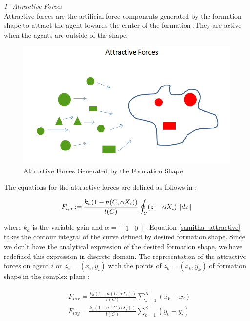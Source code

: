 \textit{			1- Attractive Forces} \\ 
Attractive forces are the artificial force components generated by the formation shape to attract the agent towards the center of the formation .They are active when the agents are outside of the shape. 

\begin{figure}[H]
\caption{Attractive Forces Generated by the Formation Shape}
\centering
\includegraphics[scale = 0.60]{attractive_forces}
\end{figure}	

The equations for the attractive forces are defined as follows in \cite{17}:			

\begin{equation} \label{samitha_attractive}
F_{i,a} := \frac{k_a (1-n(C,\alpha X_i))}{l(C)} \oint_C(z-\alpha X_i)\left\lVert dz\right\rVert
\end{equation}

where $k_a$ is the variable gain and $\alpha = \begin{bmatrix}
1 & 0
		\end{bmatrix}$. Equation \ref{samitha_attractive} takes the contour integral of the curve defined by desired formation shape. Since we don't have the analytical expression of the desired formation shape, we have redefined this expression in discrete domain. The representation of the attractive forces on agent $i$ on $z_i = (x_i, y_i)$ with the points of  $z_k = (x_k,y_k)$ of formation shape in the complex plane \cite{17}:

\begin{align}
\begin{split}
& F_{iax} =\frac{k_a (1-n(C,\alpha X_i))}{l(C)}  \sum_{k=1}^{K} (x_k  - x_i)\\
& F_{iay} =\frac{k_a (1-n(C,\alpha X_i))}{l(C)}  \sum_{k=1}^{K} (y_k  - y_i)\\
\end{split}
\end{align}
			

